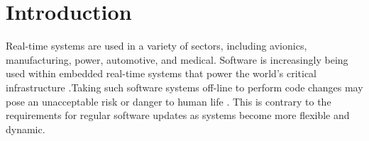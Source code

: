 \chapter{Introduction}




Real-time systems are used in a variety of sectors, including avionics, manufacturing, power, automotive, and medical. Software is increasingly being used within embedded real-time systems that power the world's critical infrastructure \autocite{stankovicStrategicDirectionsRealtime1996}.Taking such software systems off-line to perform code changes may pose an unacceptable risk or danger to human life \autocite{montgomeryModelUpdatingRealTime2004}. This is contrary to the requirements for regular software updates as systems become more flexible and dynamic.


